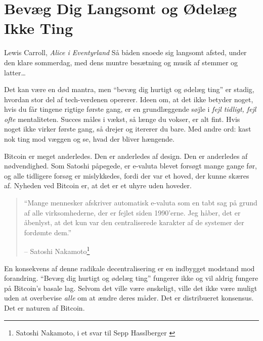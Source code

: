 \chapter{Bevæg Dig Langsomt og Ødelæg Ikke Ting}
\label{les:18}

\begin{chapquote}{Lewis Carroll, \textit{Alice i Eventyrland}}
Så båden snoede sig langsomt afsted, under den klare sommerdag, med dens muntre 
besætning og musik af stemmer og latter\ldots
\end{chapquote}

Det kan være en død mantra, men \enquote{bevæg dig hurtigt og ødelæg ting} er 
stadig, hvordan stor del af tech-verdenen opererer. Ideen om, at det ikke
betyder noget, hvis du får tingene rigtige første gang, er en grundlæggende 
søjle i \textit{fejl tidligt, fejl ofte} mentaliteten. Succes måles i vækst, 
så længe du vokser, er alt fint. Hvis noget ikke virker første gang, så
drejer og itererer du bare. Med andre ord: kast nok ting mod
væggen og se, hvad der bliver hængende.

Bitcoin er meget anderledes. Den er anderledes af design. Den er anderledes
af nødvendighed. Som Satoshi påpegede, er e-valuta blevet forsøgt
mange gange før, og alle tidligere forsøg er mislykkedes, fordi der
var et hoved, der kunne skæres af. Nyheden ved Bitcoin er, at det er
et uhyre uden hoveder.

\begin{quotation}\begin{samepage}
\enquote{Mange mennesker afskriver automatisk e-valuta som en tabt sag
på grund af alle virksomhederne, der er fejlet siden 1990'erne. Jeg håber, det 
er åbenlyst, at det kun var den centraliserede karakter af de systemer
der fordømte dem.}
\begin{flushright} -- Satoshi Nakamoto\footnote{Satoshi Nakamoto, i et svar 
    til Sepp Hasslberger \cite{satoshi-centralized-nature}}
\end{flushright}\end{samepage}\end{quotation}

En konsekvens af denne radikale decentralisering er en indbygget modstand 
mod forandring. \enquote{Bevæg dig hurtigt og ødelæg ting} fungerer ikke 
og vil aldrig fungere på Bitcoin's basale lag. Selvom det ville være 
ønskeligt, ville det ikke være muligt uden at overbevise \textit{alle} 
om at ændre deres måder. Det er distribueret konsensus. Det er naturen 
af Bitcoin.

